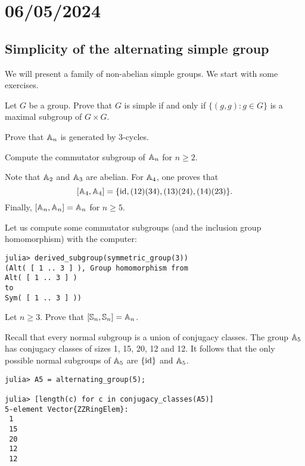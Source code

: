 \section{06/05/2024}

\subsection{Simplicity of the alternating simple group}

We will present a family of non-abelian simple groups. 
We start with some exercises. 

\begin{exercise}
\label{xca:diagonal}
    Let $G$ be a group. 
    Prove that $G$ is simple if and only if 
    $\{(g,g):g\in G\}$ 
    is a maximal subgroup of $G\times G$. 
\end{exercise}

\begin{exercise}
    Prove that $\mathbb{A}_n$ is generated by 3-cycles. 
\end{exercise}

\begin{exercise}
    Compute the commutator subgroup of $\mathbb{A}_n$ for
    $n\geq2$. 
\end{exercise}

Note that $\mathbb{A}_2$ and $\mathbb{A}_3$ are abelian. 
For $\mathbb{A}_4$, one proves that 
\[
[\mathbb{A}_4,\mathbb{A}_4]=\{\operatorname{id},(12)(34),(13)(24),(14)(23)\}.
\]
Finally, $[\mathbb{A}_n,\mathbb{A}_n]=\mathbb{A}_n$ for $n\geq5$. 

Let us compute some commutator subgroups (and the inclusion group homomorphism)  
with the computer:
\begin{lstlisting}
julia> derived_subgroup(symmetric_group(3))
(Alt( [ 1 .. 3 ] ), Group homomorphism from 
Alt( [ 1 .. 3 ] )
to
Sym( [ 1 .. 3 ] ))    
\end{lstlisting}

\begin{exercise}
    Let $n\geq3$. 
    Prove that $[\mathbb{S}_n,\mathbb{S}_n]=\mathbb{A}_n$. 
\end{exercise}

Recall that every normal subgroup is a union of conjugacy classes. The group 
$\mathbb{A}_5$ has conjugacy classes of sizes 1, 15, 20, 12 and 12. It follows that 
the only possible normal subgroups of $\mathbb{A}_5$ are $\{\operatorname{id}\}$ and $\mathbb{A}_5$. 
\begin{lstlisting}
julia> A5 = alternating_group(5);

julia> [length(c) for c in conjugacy_classes(A5)]
5-element Vector{ZZRingElem}:
 1
 15
 20
 12
 12 
\end{lstlisting}

